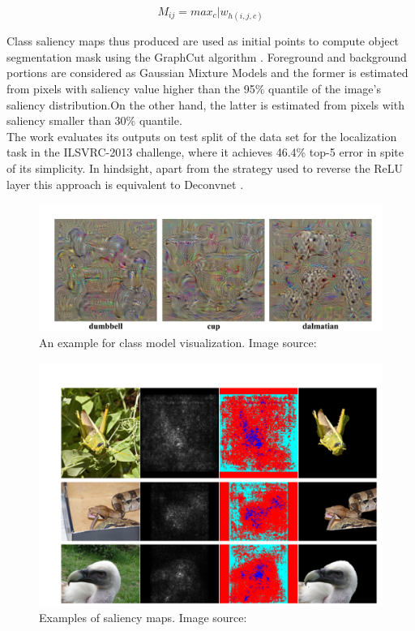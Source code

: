 \documentclass[../report.tex]{subfiles}
\begin{document}
 \begin{equation*}
 	M_{ij} = max_{c}|w_{h(i,j,c)}
 \end{equation*}
 
 Class saliency maps thus produced are used as initial points  to compute object segmentation mask using the GraphCut algorithm \cite{boykov2006graph}. Foreground and background portions are considered as Gaussian Mixture Models and the former is estimated from pixels with saliency value higher than the 95\% quantile of the image’s saliency distribution.On the other hand, the latter is estimated from pixels with saliency smaller than 30\% quantile.\\
 The work evaluates its outputs on test split of the data set for the localization task in the ILSVRC-2013 \cite{ILSVRC15} challenge, where it achieves 46.4\% top-5 error in spite of its simplicity.
 In hindsight, apart from the strategy used to reverse the ReLU layer this approach is equivalent to Deconvnet \cite{matthew2014visualizing}.
 
 
 \begin{figure}[H]
 	\centering
 	\includegraphics[scale=0.25]{images/chapter3/saliency_1.png}
 	\caption{An example for class model visualization. Image source: \cite{simonyan2013deep}}
 	\label{fig_cmv}
 \end{figure}
 
  \begin{figure}[H]
  	\centering
 	\includegraphics[scale=0.2]{images/chapter3/saliency_2.png}
 	\caption{Examples of saliency maps. Image source: \cite{simonyan2013deep}}
 	\label{fig_saliency_map}
 \end{figure}
  
\end{document}
